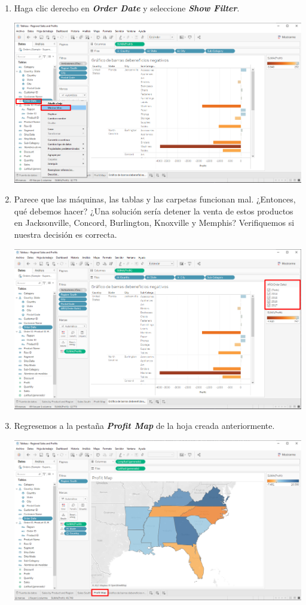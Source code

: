 \documentclass[12pt,letterpaper]{article}
\begin{document}
\begin{enumerate}
        \item Haga clic derecho en \textit{\textbf{Order Date}} y seleccione \textit{\textbf{Show Filter}}.
        \begin{center}
            \includegraphics[width=15cm]{./img/img59.png}
        \end{center}
        \item Parece que las máquinas, las tablas y las carpetas funcionan mal. ¿Entonces, qué debemos hacer? ¿Una solución sería detener la venta de estos productos en Jacksonville, Concord, Burlington, Knoxville y Memphis? Verifiquemos si nuestra decisión es correcta.
        \begin{center}
            \includegraphics[width=15cm]{./img/img60.png}
        \end{center}
        \item Regresemos a la pestaña \textit{\textbf{Profit Map}} de la hoja creada anteriormente.
        \begin{center}
            \includegraphics[width=15cm]{./img/img61.png}

\end{center}
\end{enumerate}
\end{document}
